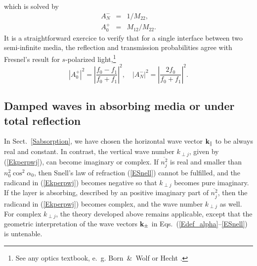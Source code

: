 which is solved by
\begin{equation}
  \begin{array}{lcl}
    A^-_N &=& 1/M_{22},\\[.2ex]
    A^+_0 &=& M_{12}/M_{22}.
  \end{array}
\end{equation}
It is a straightforward exercice to verify
that for a single interface between two semi-infinite media,
the reflection and transmission probabilities
agree with Fresnel's result for $s$-polarized light,\footnote
{See any optics textbook, e.~g. Born~\&~Wolf \cite[ch.~1.5.2]{BoWo99}
  or Hecht \cite[ch.~4.6.2]{Hec02}.}
\begin{equation}
  \left| A^+_0\right|^2
  = \left|\frac{f_0-f_1}{f_0+f_1}\right|^2,
  \quad
  \left| A^-_N\right|^2
  = \left| \frac{2f_0}{f_0+f_1}\right|^2.
\end{equation}


\subsection{Damped waves in absorbing media
  or under total reflection}\label{s:complex}

In Sect.~\ref{Sabsorption},
we have chosen the horizontal wave vector $\mathbf{k}_{\parallel}$
to be always real and constant.
In contrast, the vertical wave number $k_{\perp j}$,
given by (\ref{Ekperpwj}),
can become imaginary or complex.
If $\overline{n_j^2}$ is real and smaller than~$n_0^2\cos^2\alpha_0$,
then Snell's law of refraction (\ref{ESnell}) cannot be fulfilled,
and the radicand in (\ref{Ekperpwj}) becomes negative
so that $k_{\perp j}$ becomes pure imaginary.
%
If the layer is absorbing,
described by an positive imaginary part of $\overline{n_j^2}$,
then the radicand in (\ref{Ekperpwj}) becomes complex,
and the wave number $k_{\perp j}$ as well.
For complex $k_{\perp j}$,
the theory developed above remains applicable,
except that the geometric interpretation of the wave vectors $\mathbf{k}_\pm$
in Eqs.~(\ref{Edef_alpha}--\ref{ESnell}) is untenable.

